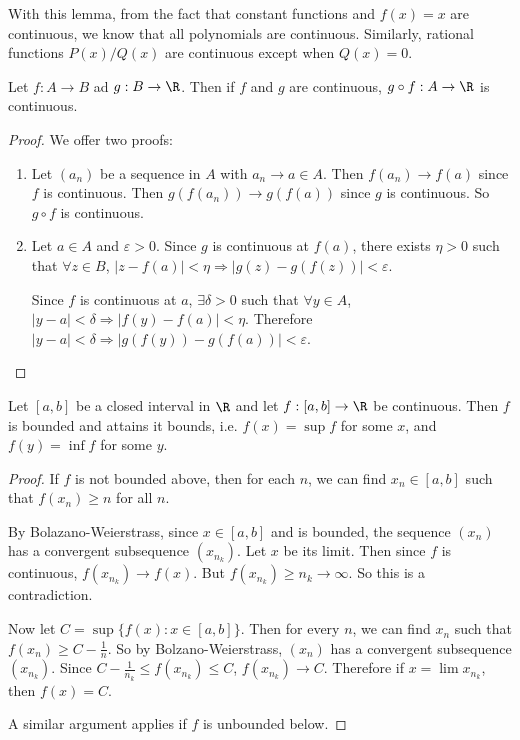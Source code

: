 \documentclass[a4paper]{article}
\begin{document}
With this lemma, from the fact that constant functions and $f(x) = x$ are continuous, we know that all polynomials are continuous. Similarly, rational functions $P(x)/Q(x)$ are continuous except when $Q(x) = 0$.

\begin{lemma}
  Let $f: A\to B$ ad $g: B\to \R$. Then if $f$ and $g$ are continuous, $g\circ f: A\to \R$ is continuous.
\end{lemma}

\begin{proof}
  We offer two proofs:
  \begin{enumerate}
    \item Let $(a_n)$ be a sequence in $A$ with $a_n \to a\in A$. Then $f(a_n) \to f(a)$ since $f$ is continuous. Then $g(f(a_n)) \to g(f(a))$ since $g$ is continuous. So $g\circ f$ is continuous.
    \item Let $a\in A$ and $\varepsilon > 0$. Since $g$ is continuous at $f(a)$, there exists $\eta > 0$ such that $\forall z\in B$, $|z - f(a)| < \eta \Rightarrow |g(z) - g(f(z))| < \varepsilon$.

      Since $f$ is continuous at $a$, $\exists \delta > 0$ such that $\forall y\in A$, $|y - a| < \delta \Rightarrow |f(y) - f(a)| < \eta$. Therefore $|y - a| < \delta \Rightarrow |g(f(y)) - g(f(a))| < \varepsilon$.
  \end{enumerate}
\end{proof}

\begin{thm}
  Let $[a, b]$ be a closed interval in $\R$ and let $f: [a, b] \to \R$ be continuous. Then $f$ is bounded and attains it bounds, i.e. $f(x) = \sup f$ for some $x$, and $f(y) = \inf f$ for some $y$.
\end{thm}

\begin{proof}
  If $f$ is not bounded above, then for each $n$, we can find $x_n\in [a, b]$ such that $f(x_n) \geq n$ for all $n$.

  By Bolazano-Weierstrass, since $x\in [a, b]$ and is bounded, the sequence $(x_n)$ has a convergent subsequence $(x_{n_k})$. Let $x$ be its limit. Then since $f$ is continuous, $f(x_{n_k}) \to f(x)$. But $f(x_{n_k}) \geq n_k \to \infty$. So this is a contradiction.

  Now let $C = \sup\{f(x): x\in [a, b]\}$. Then for every $n$, we can find $x_n$ such that $f(x_n) \geq C - \frac{1}{n}$. So by Bolzano-Weierstrass, $(x_n)$ has a convergent subsequence $(x_{n_k})$. Since $C - \frac{1}{n_{k}}\leq f(x_{n_k}) \leq C$, $f(x_{n_k})\to C$. Therefore if $x = \lim x_{n_k}$, then $f(x) = C$.

  A similar argument applies if $f$ is unbounded below.
\end{proof}
\end{document}
